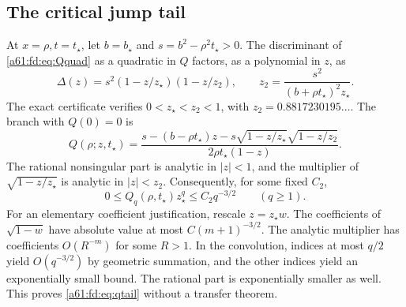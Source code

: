 \documentclass[11pt,letterpaper]{article}
\numberwithin{equation}{section}
\theoremstyle{remark}\newtheorem{remark}[theorem]{Remark}
\newcommand{\st}{\star}
\begin{document}
\subsection{The critical jump tail}
At $x=\rho,t=t_\st$, let $b=b_\st$ and $s=b^2-\rho^2t_\st>0$. The discriminant of \eqref{a61:fd:eq:Qquad} as a quadratic in $Q$ factors, as a polynomial in $z$, as
\[
 \Delta(z)=s^2(1-z/z_\st)(1-z/z_2),\qquad
 z_2=\frac{s^2}{(b+\rho t_\st)^2z_\st}.
\]
The exact certificate verifies $0<z_\st<z_2<1$, with $z_2=0.8817230195\ldots$. The branch with $Q(0)=0$ is
\begin{equation}\label{a61:fd:eq:sqrt}
 Q(\rho;z,t_\st)=
 \frac{s-(b-\rho t_\st)z-s\sqrt{1-z/z_\st}\sqrt{1-z/z_2}}
      {2\rho t_\st(1-z)}.
\end{equation}
The rational nonsingular part is analytic in $|z|<1$, and the multiplier of $\sqrt{1-z/z_\st}$ is analytic in $|z|<z_2$. Consequently, for some fixed $C_2$,
\begin{equation}\label{a61:fd:eq:qtail}
 0\le Q_q(\rho,t_\st)z_\st^q\le C_2q^{-3/2}\qquad(q\ge1).
\end{equation}
For an elementary coefficient justification, rescale $z=z_\st w$. The coefficients of $\sqrt{1-w}$ have absolute value at most $C(m+1)^{-3/2}$. The analytic multiplier has coefficients $O(R^{-m})$ for some $R>1$. In the convolution, indices at most $q/2$ yield $O(q^{-3/2})$ by geometric summation, and the other indices yield an exponentially small bound. The rational part is exponentially smaller as well. This proves \eqref{a61:fd:eq:qtail} without a transfer theorem.
\end{document}
